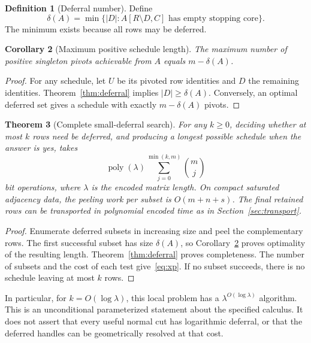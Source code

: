 \documentclass[11pt]{article}
\newtheorem{theorem}{Theorem}[section]
\newtheorem{corollary}[theorem]{Corollary}
\theoremstyle{definition}\newtheorem{definition}[theorem]{Definition}
\theoremstyle{remark}\newtheorem{remark}[theorem]{Remark}
\begin{document}
\begin{definition}[Deferral number]
Define
\[
 \delta(A)=\min\{|D|:A[R\setminus D,C]\text{ has empty stopping core}\}.
\]
The minimum exists because all rows may be deferred.
\end{definition}

\begin{corollary}[Maximum positive schedule length]
\label{cor:maximum}
The maximum number of positive singleton pivots achievable from $A$ equals $m-\delta(A)$.
\end{corollary}
\begin{proof}
For any schedule, let $U$ be its pivoted row identities and $D$ the remaining identities. Theorem~\ref{thm:deferral} implies $|D|\geq\delta(A)$. Conversely, an optimal deferred set gives a schedule with exactly $m-\delta(A)$ pivots.
\end{proof}

\begin{theorem}[Complete small-deferral search]
\label{thm:search}
For any $k\geq0$, deciding whether at most $k$ rows need be deferred, and producing a longest possible schedule when the answer is yes, takes
\begin{equation}
 \operatorname{poly}(\lambda)\sum_{j=0}^{\min(k,m)}\binom mj
 \label{eq:xp}
\end{equation}
bit operations, where $\lambda$ is the encoded matrix length. On compact saturated adjacency data, the peeling work per subset is $O(m+n+s)$. The final retained rows can be transported in polynomial encoded time as in Section~\ref{sec:transport}.
\end{theorem}
\begin{proof}
Enumerate deferred subsets in increasing size and peel the complementary rows. The first successful subset has size $\delta(A)$, so Corollary~\ref{cor:maximum} proves optimality of the resulting length. Theorem~\ref{thm:deferral} proves completeness. The number of subsets and the cost of each test give~\eqref{eq:xp}. If no subset succeeds, there is no schedule leaving at most $k$ rows.
\end{proof}

In particular, for $k=O(\log\lambda)$, this local problem has a $\lambda^{O(\log\lambda)}$ algorithm. This is an unconditional parameterized statement about the specified calculus. It does not assert that every useful normal cut has logarithmic deferral, or that the deferred handles can be geometrically resolved at that cost.
\end{document}
